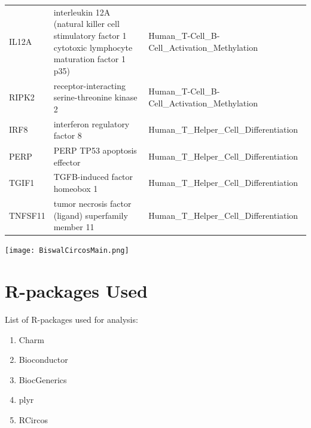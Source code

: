 \documentclass[11pt]{article}
\begin{document}
\begin{table}[H]
{\begin{tabular}{|l|l|l|}
IL12A         & interleukin 12A (natural killer cell stimulatory factor 1  cytotoxic lymphocyte maturation factor 1  p35) & Human\_T-Cell\_B-Cell\_Activation\_Methylation             \\ 
RIPK2         & receptor-interacting serine-threonine kinase 2                                                            & Human\_T-Cell\_B-Cell\_Activation\_Methylation             \\ 
IRF8          & interferon regulatory factor 8                                                                            & Human\_T\_Helper\_Cell\_Differentiation                    \\ 
PERP          & PERP  TP53 apoptosis effector                                                                             & Human\_T\_Helper\_Cell\_Differentiation                    \\ 
TGIF1         & TGFB-induced factor homeobox 1                                                                            & Human\_T\_Helper\_Cell\_Differentiation                    \\ 
TNFSF11       & tumor necrosis factor (ligand) superfamily  member 11                                                     & Human\_T\_Helper\_Cell\_Differentiation                    \\ \hline
\end{tabular}}
\end{table}



\texttt{[image: BiswalCircosMain.png]}



\section*{R-packages Used}

List of R-packages used for analysis:
\begin{enumerate}[itemsep=-0.2mm]

\item Charm

\item Bioconductor

\item BiocGenerics

\item plyr

\item RCircos


\end{enumerate}
\end{document}
